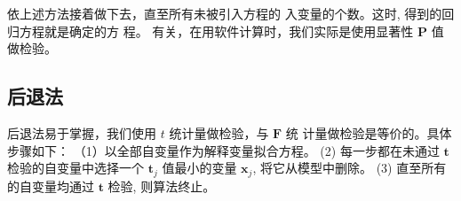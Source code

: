 依上述方法接着做下去，直至所有未被引入方程的
入变量的个数。这时, 得到的回归方程就是确定的方
程。
有关，在用软件计算时，我们实际是使用显著性 \( \boldsymbol{P} \) 值
做检验。

\subsection{后退法}

后退法易于掌握，我们使用 \( t \) 统计量做检验，与 \( \boldsymbol{F} \) 统
计量做检验是等价的。具体步骤如下：
（1）以全部自变量作为解释变量拟合方程。
(2) 每一步都在未通过 \( \boldsymbol{t} \) 检验的自变量中选择一个
\( \boldsymbol{t}_{j} \) 值最小的变量 \( \boldsymbol{x}_{j} \), 将它从模型中删除。
(3) 直至所有的自变量均通过 \( \boldsymbol{t} \) 检验, 则算法终止。